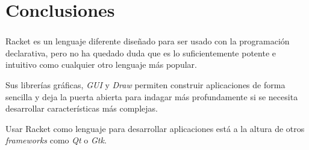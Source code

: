 \section{Conclusiones}

\begin{frame}
    \frametitle{\insertsection}
    \framesubtitle{\hskip30pt \insertsubsection}

    \begin{block}{}
       Racket es un lenguaje diferente diseñado para ser usado con la programación declarativa,
       pero no ha quedado duda que es lo suficientemente potente e intuitivo como 
       cualquier otro lenguaje más popular.
    \end{block}
       
    \begin{block}{}
       Sus librerías gráficas, \emph{GUI} y \emph{Draw} permiten 
       construir aplicaciones de forma sencilla y deja la puerta abierta para indagar más profundamente
       si se necesita desarrollar características más complejas.
    \end{block}

    \begin{block}{}
       Usar Racket como lenguaje para desarrollar aplicaciones está a la altura de otros \textit{frameworks}
       como \textit{Qt} o \textit{Gtk}.
    \end{block}
    
\end{frame}